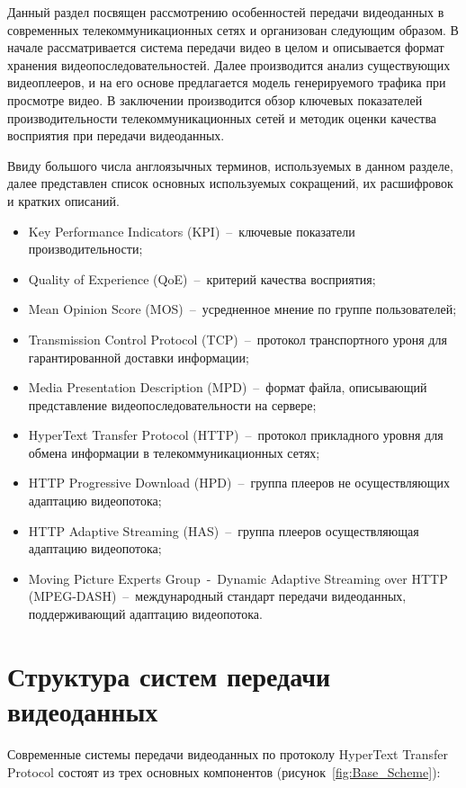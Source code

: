 Данный раздел посвящен рассмотрению особенностей передачи видеоданных в современных телекоммуникационных сетях и организован следующим образом. В начале рассматривается система передачи видео в целом и описывается формат хранения видеопоследовательностей. Далее производится анализ существующих видеоплееров, и на его основе предлагается модель генерируемого трафика при просмотре видео. В заключении производится обзор ключевых показателей производительности телекоммуникационных сетей и методик оценки качества восприятия при передачи видеоданных.

Ввиду большого числа англоязычных терминов, используемых в данном разделе, далее представлен список основных используемых сокращений, их расшифровок и кратких описаний.
\begin{itemize}
  \item Key Performance Indicators (KPI)~--~ключевые показатели производительности;
  \item Quality of Experience (QoE)~--~критерий качества восприятия;
  \item Mean Opinion Score (MOS)~--~усредненное мнение по группе пользователей;
  \item Transmission Control Protocol (TCP)~--~протокол транспортного уроня для гарантированной доставки информации;
  \item Media Presentation Description (MPD)~--~формат файла, описывающий представление видеопоследовательности на сервере;
  \item HyperText Transfer Protocol (HTTP)~--~протокол прикладного уровня для обмена информации в телекоммуникационных сетях;
  \item HTTP Progressive Download (HPD)~--~группа плееров не осуществляющих адаптацию видеопотока;
  \item HTTP Adaptive Streaming (HAS)~--~группа плееров осуществляющая адаптацию видеопотока;
  \item Moving Picture Experts Group~-~Dynamic Adaptive Streaming over HTTP (MPEG-DASH)~--~международный стандарт передачи видеоданных, поддерживающий адаптацию видеопотока.
\end{itemize}

\section{Структура систем передачи видеоданных}\label{chap1:SystemStructure}

Современные системы передачи видеоданных по протоколу HyperText Transfer Protocol состоят из трех основных компонентов (рисунок~\ref{fig:Base_Scheme}):

